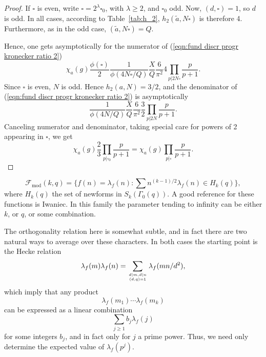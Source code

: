 \documentclass[12pt,letterpaper]{amsart}
\theoremstyle{plain}
\theoremstyle{definition}
\theoremstyle{remark}
\numberwithin{equation}{subsection}
\numberwithin{theorem}{subsection}
\numberwithin{table}{subsection}
\newcommand{\ontop}[2]{\genfrac{}{}{0pt}{}{#1}{#2}}
\begin{document}
\begin{proof}
If $\square$ is even, write $\square = 2^\lambda \square_0$, with
$\lambda \geq 2$, and $\square_0$ odd.
Now, $(d,\square)=1$, so $d$ is odd. In all cases, according to Table~\ref{tab:h_2},
$h_2(\tilde{a},N\square)$ is therefore 4. Furthermore, as in the odd case,
$(\tilde{a},N\square)=Q$. 

Hence, one gets asymptotically 
for the numerator of (\ref{eqn:fund discr progr kronecker ratio 2})
\begin{equation}
    \chi_a(g) \frac{\phi(\square)}{2}
    \frac{1}{\phi(4N\square/Q)} \frac{X}{Q} \frac{6}{\pi^2}
    4 \prod_{p|2N\square} \frac{p}{p+1}.
\end{equation}
Since $\square$ is even, $N$ is odd.
Hence $h_2(a,N)=3/2$, and the denominator of 
(\ref{eqn:fund discr progr kronecker ratio 2}) is asymptotically
\begin{equation}
    \frac{1}{\phi(4N/Q)} \frac{X}{Q} \frac{6}{\pi^2}
    \frac{3}{2}
    \prod_{p|2N} \frac{p}{p+1}.
\end{equation}
Canceling numerator and denominator, taking special care for
powers of 2 appearing in $\square$, we get 
\begin{equation}
    \chi_a(g) \frac{2}{3}
    \prod_{p|\square_0} \frac{p}{p+1} = \chi_a(g) \prod_{p|\square} \frac{p}{p+1}.
\end{equation}

\end{proof}


\begin{equation}{\mathcal F}_{\text{mod}}(k,q)=\{f(n)= \lambda_f(n):
\sum n^{(k-1)/2}\lambda_f(n) \in H_k(q)\},  
\end{equation}
where $H_k(q)$  the set of newforms in  $S_k(\Gamma_0(q))$.
A good reference for these functions is Iwaniec\cite{Iw1}.
In this family the parameter tending to infinity can be either
$k$, or $q$, or some combination.


The
orthogonality relation here is somewhat subtle, and in fact there are 
two natural ways to average over these characters.  In both cases the
starting point is the Hecke relation
\begin{equation}
\lambda_f(m)\lambda_f(n)=\sum_{ \ontop{ d|m, d|n}{(d,q)=1} } \lambda_f(mn/d^2),
\end{equation}
which imply that any product
\begin{equation}\lambda_f(m_1)\cdots \lambda_f(m_k)
\end{equation}
can be expressed as a linear combination
\begin{equation}\label{eqn:lambdajsum}
\sum_{j\ge 1} b_j \lambda_f(j)
\end{equation}
for some integers $b_j$, and in fact only for $j$ a prime power.
Thus, we need only determine the expected value of
$\lambda_f(p^j)$.
\end{document}
